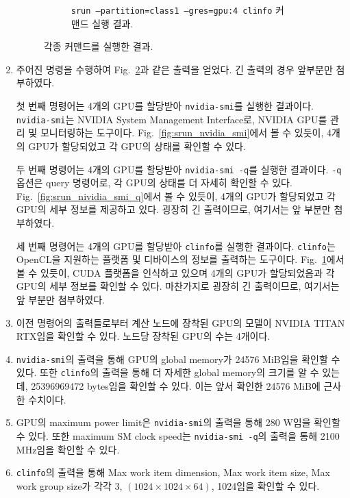 \begin{enumerate}[label= (\alph*)]
\begin{figure}[t]
\begin{subfigure}[b]{\textwidth}
            \caption{
                \texttt{srun --partition=class1 --gres=gpu:4 clinfo} 커맨드 실행 결과.
            }\label{fig:srun_clinfo}
        \end{subfigure}
        \caption{각종 커맨드를 실행한 결과.}\label{fig:srun}
    \end{figure}

    \item {
        주어진 명령을 수행하여 Fig.~\ref{fig:srun}과 같은 출력을 얻었다. 긴 출력의 경우 앞부분만 첨부하였다.

        첫 번째 명령어는 4개의 GPU를 할당받아 \texttt{nvidia-smi}를 실행한 결과이다.
        \texttt{nvidia-smi}는 NVIDIA System Management Interface로, NVIDIA GPU를 관리 및 모니터링하는 도구이다.
        Fig.~\ref{fig:srun_nvidia_smi}에서 볼 수 있듯이, 4개의 GPU가 할당되었고 각 GPU의 상태를 확인할 수 있다.

        두 번째 명령어는 4개의 GPU를 할당받아 \texttt{nvidia-smi -q}를 실행한 결과이다.
        \texttt{-q} 옵션은 query 명령어로, 각 GPU의 상태를 더 자세히 확인할 수 있다.
        Fig.~\ref{fig:srun_nividia_smi_q}에서 볼 수 있듯이, 4개의 GPU가 할당되었고
        각 GPU의 세부 정보를 제공하고 있다. 굉장히 긴 출력이므로, 여기서는 앞 부분만 첨부하였다.

        세 번째 명령어는 4개의 GPU를 할당받아 \texttt{clinfo}를 실행한 결과이다.
        \texttt{clinfo}는 OpenCL을 지원하는 플랫폼 및 디바이스의 정보를 출력하는 도구이다.
        Fig.~\ref{fig:srun_clinfo}에서 볼 수 있듯이, CUDA 플랫폼을 인식하고 있으며
        4개의 GPU가 할당되었음과 각 GPU의 세부 정보를 확인할 수 있다.
        마찬가지로 굉장히 긴 출력이므로, 여기서는 앞 부분만 첨부하였다.
    }

    \item {
        이전 명령어의 출력들로부터 계산 노드에 장착된 GPU의 모델이 NVIDIA TITAN RTX임을 확인할 수 있다.
        노드당 장착된 GPU의 수는 4개이다.
    }

    \item {
        \texttt{nvidia-smi}의 출력을 통해 GPU의 global memory가 24576 MiB임을 확인할 수 있다.
        또한 \texttt{clinfo}의 출력을 통해 더 자세한 global memory의 크기를 알 수 있는데,
        25396969472 bytes임을 확인할 수 있다. 이는 앞서 확인한 24576 MiB에 근사한 수치이다.
    }

    \item {
        GPU의 maximum power limit은 \texttt{nvidia-smi}의 출력을 통해 280 W임을 확인할 수 있다.
        또한 maximum SM clock speed는 \texttt{nvidia-smi -q}의 출력을 통해 2100 MHz임을 확인할 수 있다.
    }

    \item {
        \texttt{clinfo}의 출력을 통해 Max work item dimension, Max work item size, Max work group size가
        각각 3, $(1024\times1024\times64)$, 1024임을 확인할 수 있다.
    }

\end{enumerate}